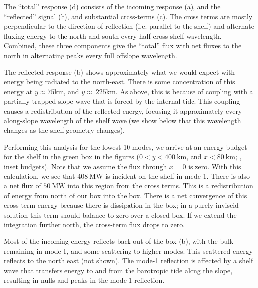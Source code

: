 \documentclass[10pt]{article}
\begin{document}
The ``total'' response (d) consists of the incoming response (a), and the ``reflected'' signal (b), and substantial cross-terms (c).  The cross terms are mostly perpendicular to the direction of reflection (i.e. parallel to the shelf) and alternate fluxing energy to the north and south every half cross-shelf wavelength.  Combined, these three components give the ``total'' flux with net fluxes to the north in alternating peaks every full offslope wavelength.  

The reflected response (b) shows approximately what we would expect with energy being radiated to the north-east.  There is some concentration of this energy at $y\approx \mathrm{75 km}$, and  $y\approx\ \mathrm{225 km}$. As above, this is because of coupling with a partially trapped slope wave that is forced by the internal tide.  This coupling causes a redistribution of the reflected energy, focusing it approximately every along-slope wavelength of the shelf wave (we show below that this wavelength changes as the shelf geometry changes).  

Performing this analysis for the lowest 10 modes, we arrive at an energy budget for the shelf in the green box in the figures ($0<y<400\ \mathrm{km}$, and $x<80\ \mathrm{km}$; , inset budgets).   Note that we assume the flux through $x=0$ is zero.   With this calculation, we see that $408\ \mathrm{MW}$ is incident on the shelf in mode-1.  There is also a net flux  of $50\ \mathrm{MW}$ into this region from the cross terms.  This is a redistribution of energy from north of our box into the box.  There is a net convergence of this cross-term energy because there is dissipation in the box; in a purely inviscid solution this term should balance to zero over a closed box.  If we extend the integration further north, the cross-term flux drops to zero.  

Most of the incoming energy reflects back out of the box (b), with the bulk remaining in mode 1, and  some scattering to higher modes.  This scattered energy reflects to the north east (not shown).  The mode-1 reflection is affected by a shelf wave that transfers energy to and from the barotropic tide along the slope, resulting in nulls and peaks in the mode-1 reflection.  
\end{document}
